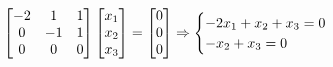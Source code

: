 \documentclass[preview]{standalone}
\begin{document}
\begin{align*}
\special{dvisvgm:raw <g id='unique000'>}\begin{bmatrix} -2 & 1 & 1 \\ 0 & -1 & 1 \\ 0 & 0 & 0 \end{bmatrix} \begin{bmatrix} x_1 \\ x_2 \\ x_3 \end{bmatrix} = \begin{bmatrix} 0 \\ 0 \\ 0 \end{bmatrix} \Rightarrow \begin{cases} -2x_1 + x_2 + x_3 = 0 \\ -x_2 + x_3 = 0 \end{cases}\special{dvisvgm:raw </g>}
\end{align*}
\end{document}
